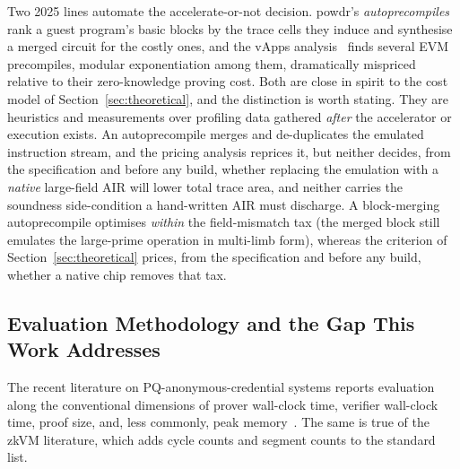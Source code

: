 Two 2025 lines automate the accelerate-or-not decision. powdr's \emph{autoprecompiles}~\cite{powdr2025autoprecompiles} rank a guest program's basic blocks by the trace cells they induce and synthesise a merged circuit for the costly ones, and the vApps analysis~\cite{vapps2025} finds several EVM precompiles, modular exponentiation among them, dramatically mispriced relative to their zero-knowledge proving cost. Both are close in spirit to the cost model of Section~\ref{sec:theoretical}, and the distinction is worth stating. They are heuristics and measurements over profiling data gathered \emph{after} the accelerator or execution exists. An autoprecompile merges and de-duplicates the emulated instruction stream, and the pricing analysis reprices it, but neither decides, from the specification and before any build, whether replacing the emulation with a \emph{native} large-field AIR will lower total trace area, and neither carries the soundness side-condition a hand-written AIR must discharge. A block-merging autoprecompile optimises \emph{within} the field-mismatch tax (the merged block still emulates the large-prime operation in multi-limb form), whereas the criterion of Section~\ref{sec:theoretical} prices, from the specification and before any build, whether a native chip removes that tax.

\subsection{Evaluation Methodology and the Gap This Work Addresses}
The recent literature on PQ-anonymous-credential systems reports evaluation along the conventional dimensions of prover wall-clock time, verifier wall-clock time, proof size, and, less commonly, peak memory~\cite{10.1007/978-981-96-0957-4_3,10.1007/978-981-95-2961-2_6}. The same is true of the zkVM literature, which adds cycle counts and segment counts to the standard list.


